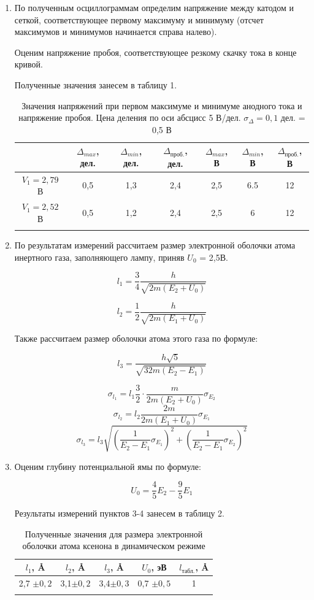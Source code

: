 \documentclass[a4paper, 12pt]{article}%
\begin{document}
\begin{enumerate}
	
	\item По полученным осциллограммам определим напряжение между катодом и сеткой, соответствующее первому максимуму и минимуму (отсчет максимумов и минимумов начинается справа налево).
	
	Оценим напряжение пробоя, соответствующее резкому скачку тока в конце кривой.
	
	Полученные значения занесем в таблицу 1.
	
	\begin{longtable}{|c|c|c|c|c|c|c|}
		\hline
		& $\Delta_{max}$, дел. & $\Delta_{min}$, дел. & $\Delta_{\text{проб.}}$, дел. & $\Delta_{max}$, В & $\Delta_{min}$, В & $\Delta_{\text{проб.}}$, В \\ \hline
		$V_1 = 2,79$ В & 0,5 & 1,3 & 2,4 & 2,5 & 6.5 & 12 \\ \hline 	
		$V_1 = 2,52$ В & 0,5 & 1,2 & 2,4 & 2,5 & 6 & 12 \\ \hline
		
		\caption{Значения напряжений при первом максимуме и минимуме анодного тока и напряжение пробоя. Цена деления по оси абсцисс 5 В/дел. $\sigma_{\Delta} = 0,1$ дел. = 0,5 В}
	\end{longtable}
	
	\newpage
	\item По результатам измерений рассчитаем размер электронной оболочки атома инертного газа, заполняющего лампу, приняв $U_0$ = 2,5В.
	
	$$ l_1 = \frac{3}{4} \frac{h}{\sqrt{2m(E_2 + U_0)}} $$
	
	$$ l_2 = \frac{1}{2} \frac{h}{\sqrt{2m(E_1 + U_0)}} $$
	
	Также рассчитаем размер оболочки атома этого газа по формуле:
	
	$$ l_3 = \frac{h\sqrt{5}}{\sqrt{32m(E_2 - E_1)}} $$
	
	$$ \sigma_{l_1} = l_1\frac{3}{2} \cdot \frac{m}{2m(E_2 + U_0)} \sigma_{E_2} $$
	$$ \sigma_{l_2} = l_2 \frac{2m}{2m(E_1 + U_0)} \sigma_{E_1}$$
	$$ \sigma_{l_3} = l_3 \sqrt{ \left( \frac{1}{E_2 - E_1} \sigma_{E_1} \right)^2 + \left(  \frac{1}{E_2 - E_1} \sigma_{E_2} \right) ^2}$$
	
	\item Оценим глубину потенциальной ямы по формуле: 
	
	$$ U_0 = \frac{4}{5} E_2 - \frac{9}{5} E_1$$
	
	Результаты измерений пунктов 3-4 занесем в таблицу 2.
	
	\begin{longtable}{|c|c|c|c|c|}
		\hline
		$l_1$, \AA & $l_2$, \AA & $l_3$, \AA & $U_0$, эВ & $l_{\text{табл.}}$, \AA\\ \hline
		2,7 $\pm0,2$ & 3,1$\pm0,2$ & 3,4$\pm0,3$ & 0,7 $\pm0,5$ & 1\\ \hline
		\caption{Полученные значения для размера электронной оболочки атома ксенона в динамическом режиме}
	\end{longtable}
	

\end{enumerate}
\end{document}
